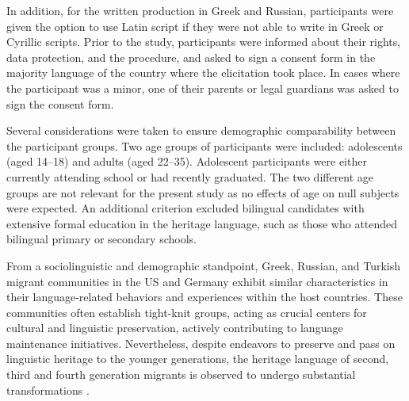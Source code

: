 \documentclass[output=paper,colorlinks,citecolor=brown]{langscibook}
\begin{document}
In addition, for the written production in Greek and Russian, participants were given the option to use Latin script if they were not able to write in Greek or Cyrillic scripts. 
Prior to the study, participants were informed about their rights, data protection, and the procedure, and asked to sign a consent form in the majority language of the country where the elicitation took place. 
In cases where the participant was a minor, one of their parents or legal guardians was asked to sign the consent form.


Several considerations were taken to ensure demographic comparability between the participant groups. Two age groups of participants were included: adolescents (aged 14--18) and adults (aged 22--35). Adolescent participants were either currently attending school or had recently graduated. The two different age groups are not relevant for the present study as no effects of age on null subjects were expected. An additional criterion excluded bilingual candidates with extensive formal education in the heritage language, such as those who attended bilingual primary or secondary schools.

From a sociolinguistic and demographic standpoint, Greek, Russian, and Turkish migrant communities in the US and Germany exhibit similar characteristics in their language-related behaviors and experiences within the host countries. These communities often establish tight-knit groups, acting as crucial centers for cultural and linguistic preservation, actively contributing to language maintenance initiatives. Nevertheless, despite endeavors to preserve and pass on linguistic heritage to the younger generations, the heritage language of second, third and fourth generation migrants is observed to undergo substantial transformations \parencite{ benmamoun2013heritage, polinsky2018heritage}.
\end{document}
